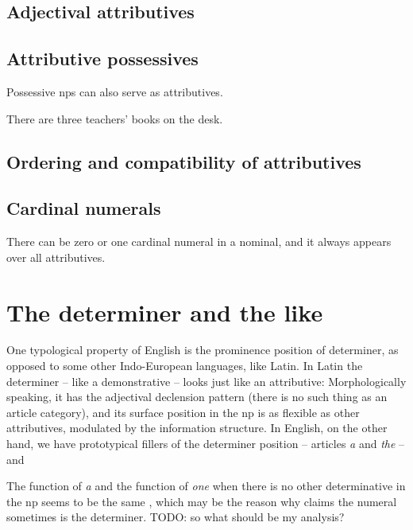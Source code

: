 \documentclass[UTF8, a4paper, oneside, scheme=plain]{ctexrep}
\newcommand*{\citepage}[1]{pp.~{#1}}
\newcommand{\corpus}[1]{\emph{#1}}
\begin{document}
\subsection{Adjectival attributives}

\subsection{Attributive possessives}

Possessive \acs{np}s can also serve as attributives. 

\begin{exe}
    \ex There are three teachers' books on the desk.
\end{exe}

\subsection{Ordering and compatibility of attributives}

\subsection{Cardinal numerals}

There can be zero or one cardinal numeral in a nominal,
and it always appears over all attributives.

\begin{exe}
    \ex 
\end{exe}

\section{The determiner and the like}\label{sec:np.det}

One typological property of English is 
the prominence position of determiner,
as opposed to some other Indo-European languages, like Latin.
In Latin the determiner -- like a demonstrative -- 
looks just like an attributive:
Morphologically speaking, it has the adjectival declension pattern
(there is no such thing as an article category),
and its surface position in the \acs{np} 
is as flexible as other attributives,
modulated by the information structure.
In English, on the other hand, we have prototypical fillers of the determiner position
-- articles \corpus{a} and \corpus{the} -- 
and 

The function of \corpus{a} 
and the function of \corpus{one} when there is no other determinative in the \acs{np}
seems to be the same \citet[\citepage{372}]{cgel},
which may be the reason why \citet[\citepage{385}]{cgel} claims 
the numeral sometimes is the determiner. TODO: so what should be my analysis?
\end{document}
